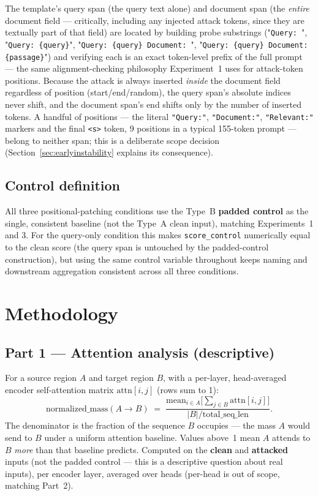\documentclass[11pt]{article}
\begin{document}
The template's query span (the query text alone) and document span (the
\emph{entire} document field — critically, including any injected attack
tokens, since they are textually part of that field) are located by
building probe substrings ("\texttt{Query: }", "\texttt{Query: \{query\}}",
"\texttt{Query: \{query\} Document: }", "\texttt{Query: \{query\}
Document: \{passage\}}") and verifying each is an exact token-level prefix
of the full prompt — the same alignment-checking philosophy Experiment~1
uses for attack-token positions. Because the attack is always inserted
\emph{inside} the document field regardless of position (start/end/random),
the query span's absolute indices never shift, and the document span's end
shifts only by the number of inserted tokens. A handful of positions —
the literal \texttt{"Query:"}, \texttt{"Document:"}, \texttt{"Relevant:"}
markers and the final \texttt{<\/s>} token, 9 positions in a typical
155-token prompt — belong to neither span; this is a deliberate scope
decision (Section~\ref{sec:earlyinstability} explains its consequence).

\subsection{Control definition}

All three positional-patching conditions use the Type~B \textbf{padded
control} as the single, consistent baseline (not the Type~A clean input),
matching Experiments~1 and 3. For the query-only condition this makes
\texttt{score\_control} numerically equal to the clean score (the query
span is untouched by the padded-control construction), but using the same
control variable throughout keeps naming and downstream aggregation
consistent across all three conditions.

\section{Methodology}

\subsection{Part 1 — Attention analysis (descriptive)}

For a source region $A$ and target region $B$, with a per-layer,
head-averaged encoder self-attention matrix $\text{attn}[i,j]$ (rows sum to
1):
\begin{equation}
\text{normalized\_mass}(A\to B) \;=\;
\frac{\text{mean}_{i \in A}\big[\sum_{j \in B} \text{attn}[i,j]\big]}
     {|B| / \text{total\_seq\_len}}.
\label{eq:attnmass}
\end{equation}
The denominator is the fraction of the sequence $B$ occupies — the mass $A$
would send to $B$ under a uniform attention baseline. Values above~1 mean
$A$ attends to $B$ \emph{more} than that baseline predicts. Computed on the
\textbf{clean} and \textbf{attacked} inputs (not the padded control — this
is a descriptive question about real inputs), per encoder layer, averaged
over heads (per-head is out of scope, matching Part~2).
\end{document}

